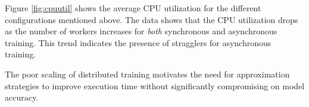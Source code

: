 Figure \ref{fig:cpuutil} shows the average CPU utilization for the 
different configurations mentioned above. The data shows that the 
CPU utilization drops as the number of workers increases for 
{\em both} synchronous and asynchronous training. This trend
indicates the presence of stragglers for asynchronous training.

The poor scaling of distributed training motivates the need for
approximation strategies to improve execution time without 
significantly compromising on model accuracy.





